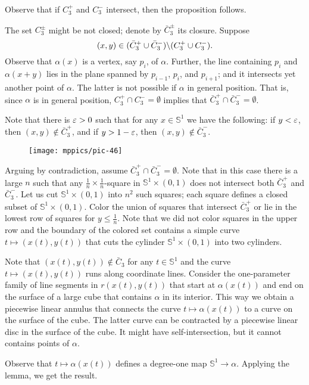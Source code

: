Observe that if $C_3^+$ and $C_3^-$ intersect, then the proposition follows.

The set $C_3^\pm$ might be not closed;
denote by $\bar C_3^\pm$ its closure.
Suppose 
\[(x,y)\in (\bar C_3^+\cup\bar C_3^-)\backslash( C_3^+\z\cup C_3^-).\]
Observe that $\alpha(x)$ is a vertex, say $p_i$, of $\alpha$.
Further, the line containing $p_i$ and $\alpha(x+y)$ lies in the plane spanned by $p_{i-1}$, $p_i$, and $p_{i+1}$; and it intersects yet another point of $\alpha$.
The latter is not possible if $\alpha$ in general position.
That is, since $\alpha$ is in general position, $C_3^+\cap C_3^-=\emptyset$ implies that $\bar C_3^+\cap \bar C_3^-=\emptyset$.

Note that there is $\varepsilon>0$ such that for any $x\in\mathbb{S}^1$ we have the following:
if $y<\varepsilon$, then $(x,y)\notin \bar C_3^+$,
and if $y>1-\varepsilon$, then $(x,y)\notin \bar C_3^-$.

\begin{wrapfigure}{r}{22 mm}
\vskip-0mm
\centering
\texttt{[image: mppics/pic-46]}
\vskip0mm
\end{wrapfigure}

Arguing by contradiction, assume $\bar C_3^+\cap \bar C_3^-=\emptyset$.
Note that in this case there is a large $n$ such that any $\tfrac1n\times\tfrac1n$-square in $\mathbb{S}^1\times (0,1)$ does not intersect both $\bar C_3^+$ and $\bar C_3^-$.
Let us cut $\mathbb{S}^1\times (0,1)$ into $n^2$ such squares; each square defines a closed subset of $\mathbb{S}^1\times (0,1)$.
Color the union of squares that intersect $\bar C_3^+$ or lie in the lowest row of squares for $y\le \tfrac1n$.
Note that we did not color squares in the upper row and the boundary of the colored set contains a simple curve $t\mapsto(x(t),y(t))$ that cuts  the cylinder $\mathbb{S}^1\times (0,1)$ into two cylinders.

Note that $(x(t),y(t))\notin \bar C_3$ for any $t\in \mathbb{S}^1$ and the curve $t\mapsto(x(t),y(t))$ runs along coordinate lines.
Consider the one-parameter family of line segments in $r(x(t),y(t))$ that start at $\alpha(x(t))$ and end on the surface of a large cube that contains $\alpha$ in its interior.
This way we obtain a piecewise linear annulus that connects the curve $t\mapsto \alpha(x(t))$ to a curve on the surface of the cube.
The latter curve can be contracted by a piecewise linear disc in the surface of the cube.
It might have self-intersection, but it cannot contains points of $\alpha$.

Observe that $t\mapsto \alpha(x(t))$ defines a degree-one map $\mathbb{S}^1\to\alpha$.
Applying the lemma, we get the result.
\qeds





